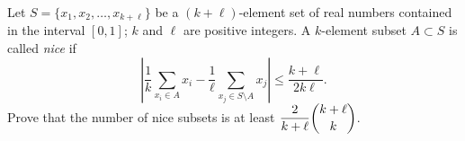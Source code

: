 Let $S = \{x_1, x_2, \ldots, x_{k+\ell}\}$ be a $(k+\ell)$-element set of real numbers contained in the interval $[0,1]$; $k$ and $\ell$ are positive integers. A $k$-element subset $A \subset S$ is called \emph{nice} if
\[
\left| \frac{1}{k} \sum_{x_i \in A} x_i - \frac{1}{\ell} \sum_{x_j \in S \setminus A} x_j \right| \leq \frac{k+\ell}{2k\ell}.
\]
Prove that the number of nice subsets is at least $\dfrac{2}{k+\ell} \dbinom{k+\ell}{k}$.
